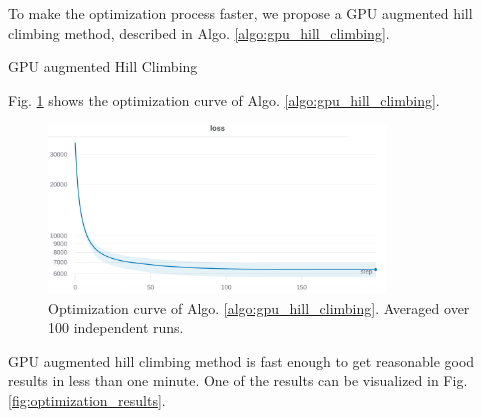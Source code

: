 To make the optimization process faster, we propose a GPU augmented hill climbing method, described in Algo. \ref{algo:gpu_hill_climbing}.

\begin{algorithm}
    \caption{GPU augmented Hill Climbing}\label{algo:gpu_hill_climbing}
\end{algorithm}

Fig. \ref{fig:gpu_hill_climbing} shows the optimization curve of Algo. \ref{algo:gpu_hill_climbing}.

\begin{figure}
    \centering
    \includegraphics[width=0.8\textwidth]{images/optimization_curve.png}
    \caption{Optimization curve of Algo. \ref{algo:gpu_hill_climbing}. Averaged over 100 independent runs.}
    \label{fig:gpu_hill_climbing}
\end{figure}

GPU augmented hill climbing method is fast enough to get reasonable good results in less than one minute.
One of the results can be visualized in Fig. \ref{fig:optimization_results}.

